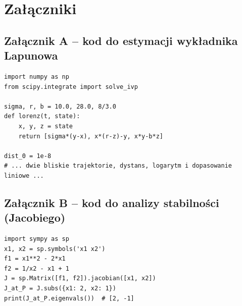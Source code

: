 \documentclass[12pt,a4paper]{article}
\begin{document}
\section{Za\l{}\k{a}czniki}
\subsection*{Za\l{}\k{a}cznik A -- kod do estymacji wyk\l{}adnika Lapunowa}
\begin{lstlisting}[style=pythonstyle]
import numpy as np
from scipy.integrate import solve_ivp

sigma, r, b = 10.0, 28.0, 8/3.0
def lorenz(t, state):
    x, y, z = state
    return [sigma*(y-x), x*(r-z)-y, x*y-b*z]

dist_0 = 1e-8
# ... dwie bliskie trajektorie, dystans, logarytm i dopasowanie liniowe ...
\end{lstlisting}

\subsection*{Za\l{}\k{a}cznik B -- kod do analizy stabilno\'sci (Jacobiego)}
\begin{lstlisting}[style=pythonstyle]
import sympy as sp
x1, x2 = sp.symbols('x1 x2')
f1 = x1**2 - 2*x1
f2 = 1/x2 - x1 + 1
J = sp.Matrix([f1, f2]).jacobian([x1, x2])
J_at_P = J.subs({x1: 2, x2: 1})
print(J_at_P.eigenvals())  # [2, -1]
\end{lstlisting}
\end{document}

